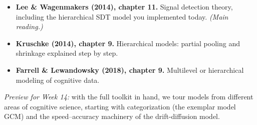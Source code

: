 \begin{itemize}
\tightlist
\item
  \textbf{Lee \& Wagenmakers (2014), chapter 11.} Signal detection
  theory, including the hierarchical SDT model you implemented today.
  \emph{(Main reading.)}
\item
  \textbf{Kruschke (2014), chapter 9.} Hierarchical models: partial
  pooling and shrinkage explained step by step.
\item
  \textbf{Farrell \& Lewandowsky (2018), chapter 9.} Multilevel or
  hierarchical modeling of cognitive data.
\end{itemize}

\emph{Preview for Week 14:} with the full toolkit in hand, we tour
models from different areas of cognitive science, starting with
categorization (the exemplar model GCM) and the speed--accuracy
machinery of the drift-diffusion model.
